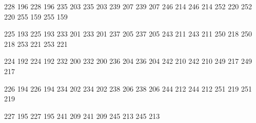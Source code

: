 

\startmapping[texnansi] 

 228 196  228 196  
 235 203  235 203
 239 207  239 207
 246 214  246 214
 252 220  252 220
 255 159  255 159

 225 193  225 193
 233 201  233 201
 237 205  237 205
 243 211  243 211
 250 218  250 218
 253 221  253 221

 224 192  224 192
 232 200  232 200
 236 204  236 204
 242 210  242 210
 249 217  249 217

 226 194  226 194
 234 202  234 202
 238 206  238 206
 244 212  244 212
 251 219  251 219

 227 195  227 195
 241 209  241 209
 245 213  245 213



\stopmapping

\startencoding[texnansi]

